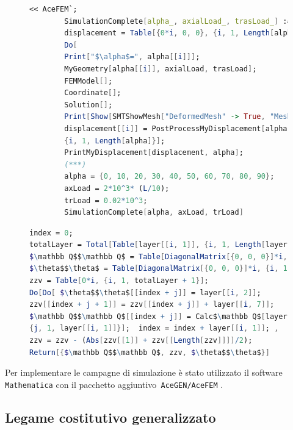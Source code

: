 \documentclass[a4paper,num-refs]{oup-contemporary}
\begin{document}
\begin{figure}[b]
	\begin{lstlisting}[language=Mathematica,caption=Struttura del codice per la simulazione nel caso \cref{sec:plate_A},label=code_general]
		<< AceFEM`;
		SimulationComplete[alpha_, axialLoad_, trasLoad_] := (
		displacement = Table[{0*i, 0, 0}, {i, 1, Length[alpha]}];
		Do[ 
		Print["$\alpha$=", alpha[[i]]];
		MyGeometry[alpha[[i]], axialLoad, trasLoad];
		FEMModel[];
		Coordinate[];
		Solution[];
		Print[Show[SMTShowMesh["DeformedMesh" -> True, "Mesh" -> GrayLevel[0.9]], SMTShowMesh["FillElements" -> False, "BoundaryConditions" -> True, "Mesh" -> GrayLevel[0]]]];
		displacement[[i]] = PostProcessMyDisplacement[alpha[[i]]];, 
		{i, 1, Length[alpha]}];
		PrintMyDisplacement[displacement, alpha];   		;
		(***)
		alpha = {0, 10, 20, 30, 40, 50, 60, 70, 80, 90};
		axLoad = 2*10^3* (L/10);
		trLoad = 0.02*10^3;
		SimulationComplete[alpha, axLoad, trLoad]
	\end{lstlisting}
	\begin{lstlisting}[language=Mathematica,caption=Snippet di \texttt{total$\mathbb Q$[]} che si occupa di generare il layout del laminato a partire dalla definizione di ogni layer,label=code_totalq]
index = 0; 
totalLayer = Total[Table[layer[[i, 1]], {i, 1, Length[layer]}]];
$\mathbb Q$$\mathbb Q$ = Table[DiagonalMatrix[{0, 0, 0}]*i, {i, 1, totalLayer}];
$\theta$$\theta$ = Table[DiagonalMatrix[{0, 0, 0}]*i, {i, 1, totalLayer}];
zzv = Table[0*i, {i, 1, totalLayer + 1}];
Do[Do[ $\theta$$\theta$[[index + j]] = layer[[i, 2]];
zzv[[index + j + 1]] = zzv[[index + j]] + layer[[i, 7]];
$\mathbb Q$$\mathbb Q$[[index + j]] = Calc$\mathbb Q$[layer[[i, 3]], layer[[i, 4]], layer[[i, 5]], layer[[i, 6]]], 
{j, 1, layer[[i, 1]]}];  index = index + layer[[i, 1]]; ,   {i, 1, Length[layer]}];
zzv = zzv - (Abs[zzv[[1]] + zzv[[Length[zzv]]]]/2);
Return[{$\mathbb Q$$\mathbb Q$, zzv, $\theta$$\theta$}] 
\end{lstlisting}

\end{figure}

Per implementare le campagne di simulazione è stato utilizzato il software \texttt{Mathematica} \citep{mathematica} con il pacchetto aggiuntivo\texttt{ AceGEN/AceFEM} \citep{ace}. 


\subsection{Legame costitutivo generalizzato}
\end{document}
